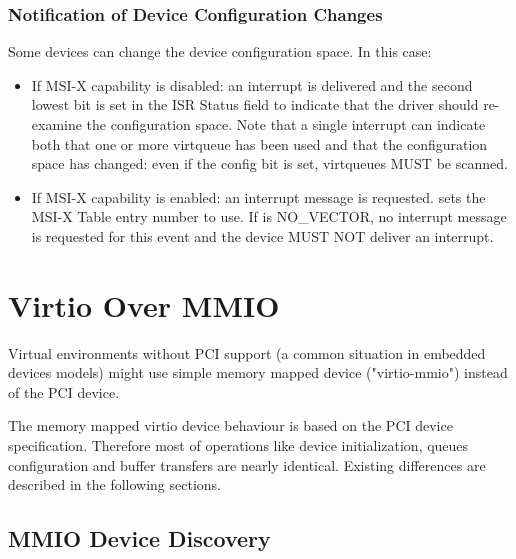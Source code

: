 \subsubsection{Notification of Device Configuration Changes}\label{sec:Virtio Transport Options / Virtio Over PCI Bus / PCI-specific Initialization And Device Operation / Notification of Device Configuration Changes}

Some devices can change the device configuration space. In this case:

\begin{itemize}
  \item If MSI-X capability is disabled: an interrupt is delivered and
  the second lowest bit is set in the ISR Status field to
  indicate that the driver should re-examine the configuration
  space.  Note that a single interrupt can indicate both that one
  or more virtqueue has been used and that the configuration
  space has changed: even if the config bit is set, virtqueues
  MUST be scanned.

  \item If MSI-X capability is enabled: an interrupt message is
  requested.  sets the MSI-X Table
  entry number to use. If  is
  NO_VECTOR, no interrupt message is requested for this event and
  the device MUST NOT deliver an interrupt.
\end{itemize}

\section{Virtio Over MMIO}\label{sec:Virtio Transport Options / Virtio Over MMIO}

Virtual environments without PCI support (a common situation in
embedded devices models) might use simple memory mapped device
("virtio-mmio") instead of the PCI device.

The memory mapped virtio device behaviour is based on the PCI
device specification. Therefore most of operations like device
initialization, queues configuration and buffer transfers are
nearly identical. Existing differences are described in the
following sections.

\subsection{MMIO Device Discovery}\label{sec:Virtio Transport Options / Virtio Over MMIO / MMIO Device Discovery}

